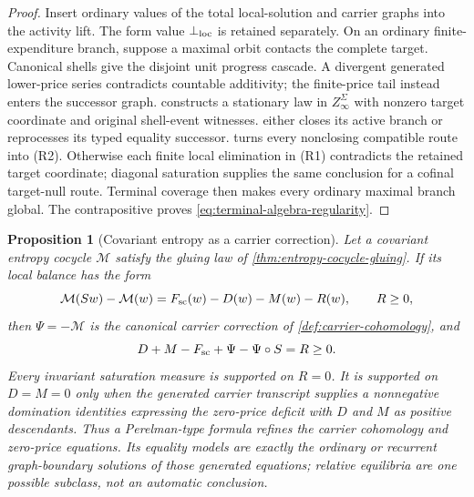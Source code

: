 \documentclass[11pt]{article}
\numberwithin{section}{part}
\theoremstyle{plain}
\newtheorem{proposition}[proposition]{Proposition}
\theoremstyle{definition}
\theoremstyle{remark}
\newcommand{\Entropy}{\mathcal M}
\begin{document}
\begin{proof}
Insert ordinary values of the total local-solution and carrier graphs into the
activity lift.  The form value \(\bot_{\rm loc}\) is retained separately.  On
an ordinary finite-expenditure branch, suppose a maximal
orbit contacts the complete target.  Canonical shells give the disjoint unit
progress cascade.  A divergent generated lower-price series contradicts
countable additivity; the finite-price tail instead enters the successor
graph.   constructs a stationary law
in \(Z_\infty^\Sigma\) with nonzero target coordinate and original shell-event
witnesses.   either
closes its active branch or reprocesses its typed equality successor.
 turns every nonclosing compatible
route into \textup{(R2)}.  Otherwise each finite local elimination in
\textup{(R1)} contradicts the retained target coordinate; diagonal
saturation supplies the same conclusion for a cofinal target-null route.
Terminal coverage then makes every ordinary maximal branch global.  The
contrapositive proves \eqref{eq:terminal-algebra-regularity}.
\end{proof}

\begin{proposition}[Covariant entropy as a carrier correction]
\label{prop:covariant-entropy-carrier-correction}
Let a covariant entropy cocycle \(\Entropy\) satisfy the gluing law of
\cref{thm:entropy-cocycle-gluing}.  If its local balance has the form
\begin{equation}
 \label{eq:entropy-carrier-correction}
 \Entropy(Sw)-\Entropy(w)
 =F_{\rm sc}(w)-D(w)-M(w)-R(w),
 \qquad R\ge0,
\end{equation}
then \(\Psi=-\Entropy\) is the canonical carrier correction of
\cref{def:carrier-cohomology}, and
\begin{equation}
 \label{eq:entropy-passivity-deficit}
 D+M-F_{\rm sc}+\Psi-\Psi\circ S=R\ge0.
\end{equation}
Every invariant saturation measure is supported on \(R=0\).  It is supported
on \(D=M=0\) only when the generated carrier transcript supplies a
nonnegative domination identities expressing the zero-price deficit with
\(D\) and \(M\) as positive descendants.  Thus a Perelman-type formula refines the carrier cohomology and
zero-price equations.  Its equality models are exactly the ordinary or
recurrent graph-boundary solutions of those generated equations; relative
equilibria are one possible subclass, not an automatic conclusion.
\end{proposition}
\end{document}
